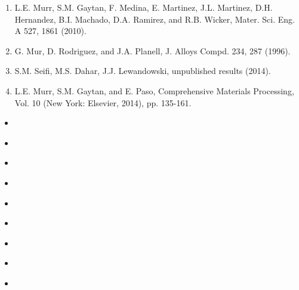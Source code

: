 \documentclass[10pt]{article}
\begin{document}
\begin{enumerate}
  \item L.E. Murr, S.M. Gaytan, F. Medina, E. Martinez, J.L. Martinez, D.H. Hernandez, B.I. Machado, D.A. Ramirez, and R.B. Wicker, Mater. Sci. Eng. A 527, 1861 (2010).

  \item G. Mur, D. Rodriguez, and J.A. Planell, J. Alloys Compd. 234, 287 (1996).

  \item S.M. Seifi, M.S. Dahar, J.J. Lewandowski, unpublished results (2014).

  \item L.E. Murr, S.M. Gaytan, and E. Paso, Comprehensive Materials Processing, Vol. 10 (New York: Elsevier, 2014), pp. 135-161.

\end{enumerate}

\begin{itemize}
  \item 
\end{itemize}

\begin{itemize}
  \item 
\end{itemize}

\begin{itemize}
  \item 
\end{itemize}

\begin{itemize}
  \item 
\end{itemize}

\begin{itemize}
  \item 
\end{itemize}

\begin{itemize}
  \item 
\end{itemize}

\begin{itemize}
  \item 
\end{itemize}

\begin{itemize}
  \item 
\end{itemize}

\begin{itemize}
  \item 
\end{itemize}
\end{document}
